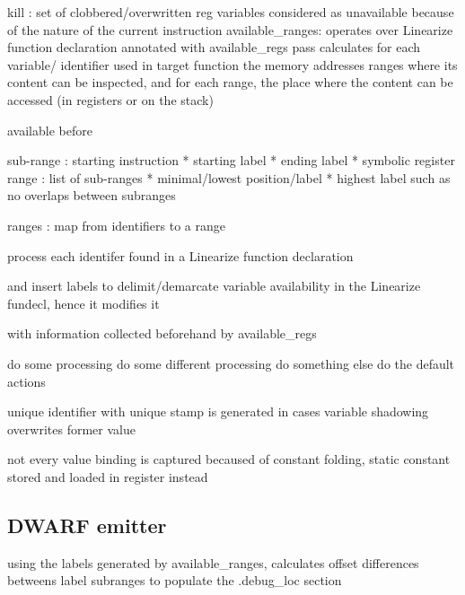 kill : set of clobbered/overwritten reg variables considered as unavailable because of the nature of the
current instruction
available\_ranges:
operates over Linearize function declaration annotated with available\_regs pass
calculates for each variable/ identifier used in target function the memory
addresses ranges where its content can be inspected, and for each range, the
place where the content can be accessed (in registers or on the stack)

available before

sub-range : starting instruction * starting label * ending label * symbolic
register
range : list of sub-ranges * minimal/lowest position/label * highest label
such as no overlaps between subranges



ranges : map from identifiers to a range

process each identifer found in a Linearize function declaration

and insert labels to delimit/demarcate variable availability in the Linearize
fundecl, hence it modifies it

with information collected beforehand by available\_regs

\begin{algorithmic}[1]
    \State do some processing
    \State do some different processing
    \State do something else
    \Else
    \State do the default actions
    \EndIf
\end{algorithmic}


unique identifier with unique stamp is generated in cases variable shadowing overwrites former value

not every value binding is captured becaused of constant folding, static
constant stored and loaded in register instead

\subsection{DWARF emitter}

using the labels generated by available\_ranges, calculates offset differences
betweens label subranges to populate the .debug\_loc section

